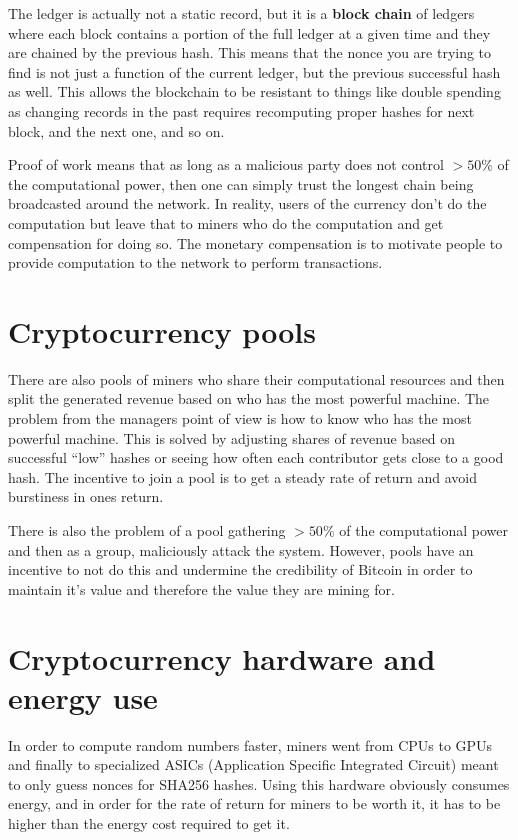 \documentclass[twoside]{article}
\begin{document}
The ledger is actually not a static record, but it is a \textbf{block chain} of ledgers where each block contains a portion of the full ledger at a given time and they are chained by the previous hash. This means that the nonce you are trying to find is not just a function of the current ledger, but the previous successful hash as well. This allows the blockchain to be resistant to things like double spending as changing records in the past requires recomputing proper hashes for next block, and the next one, and so on.

Proof of work means that as long as a malicious party does not control $>50\%$ of the computational power, then one can simply trust the longest chain being broadcasted around the network. In reality, users of the currency don't do the computation but leave that to miners who do the computation and get compensation for doing so. The monetary compensation is to motivate people to provide computation to the network to perform transactions.

\section{Cryptocurrency pools}
There are also pools of miners who share their computational resources and then split the generated revenue based on who has the most powerful machine. The problem from the managers point of view is how to know who has the most powerful machine. This is solved by adjusting shares of revenue based on successful ``low'' hashes or seeing how often each contributor gets close to a good hash. The incentive to join a pool is to get a steady rate of return and avoid burstiness in ones return.

There is also the problem of a pool gathering $>50\%$ of the computational power and then as a group, maliciously attack the system. However, pools have an incentive to not do this and undermine the credibility of Bitcoin in order to maintain it's value and therefore the value they are mining for.

\section{Cryptocurrency hardware and energy use}
In order to compute random numbers faster, miners went from CPUs to GPUs and finally to specialized ASICs (Application Specific Integrated Circuit) meant to only guess nonces for SHA256 hashes. Using this hardware obviously consumes energy, and in order for the rate of return for miners to be worth it, it has to be higher than the energy cost required to get it.
\end{document}
